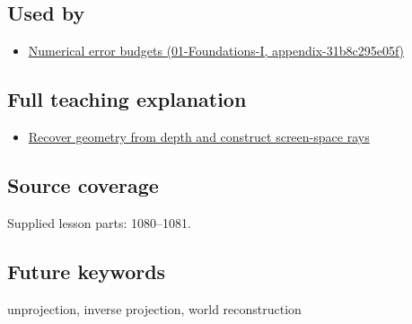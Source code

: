 \subsection{Used by}\label{used-by}

\begin{itemize}
\tightlist
\item
  \href{}{Numerical error budgets (01-Foundations-I, appendix-31b8c295e05f)}
\end{itemize}

\subsection{Full teaching explanation}\label{full-teaching-explanation}

\begin{itemize}
\tightlist
\item
  \href{Continuous\%20Notes/Computing\%20Foundations\%20-\%20From\%20Bits\%20to\%20C++\%20and\%20Systems\%20APIs\#Recover\%20geometry\%20from\%20depth\%20and\%20construct\%20screen-space\%20rays}{Recover geometry from depth and construct screen-space rays}
\end{itemize}

\subsection{Source coverage}\label{source-coverage}

Supplied lesson parts: 1080--1081.

\subsection{Future keywords}\label{future-keywords}

unprojection, inverse projection, world reconstruction
